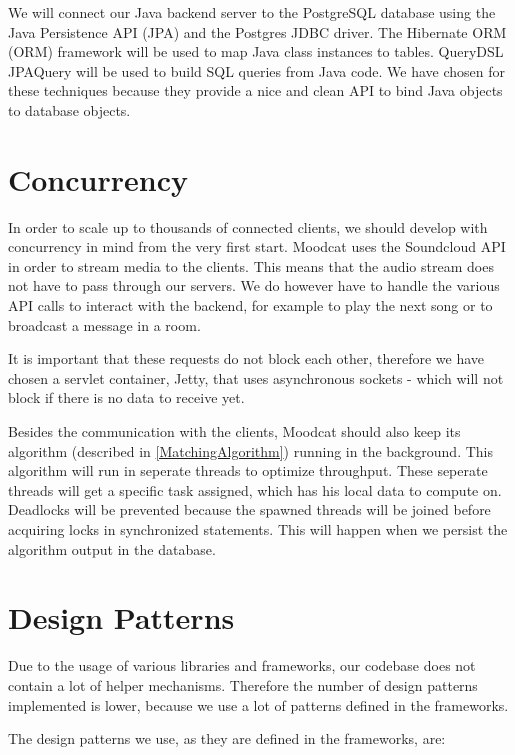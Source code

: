 \par
We will connect our Java backend server to the PostgreSQL database using the Java Persistence API (JPA) and the Postgres JDBC driver.
The Hibernate\cite{HibernateORM} \Gls{ORM} (ORM) framework will be used to map Java class instances to tables.
QueryDSL\cite{QueryDSL} JPAQuery will be used to build \Gls{SQL} queries from Java code.
We have chosen for these techniques because they provide a nice and clean API to bind Java objects to database objects.

\section{Concurrency}
In order to scale up to thousands of connected clients, we should develop with concurrency in mind from the very first start.
Moodcat uses the \gls{Soundcloud} API in order to stream media to the clients.
This means that the audio stream does not have to pass through our servers.
We do however have to handle the various API calls to interact with the backend, for example to play the next song or to broadcast a message in a room.

\par
It is important that these requests do not block each other, therefore we have chosen a servlet container, Jetty, that uses asynchronous sockets - which will not block if there is no data to receive yet.

\par
Besides the communication with the clients, Moodcat should also keep its algorithm (described in \ref{MatchingAlgorithm}) running in the background.
This algorithm will run in seperate threads to optimize throughput.
These seperate threads will get a specific task assigned, which has his local data to compute on.
Deadlocks will be prevented because the spawned threads will be joined before acquiring locks in synchronized statements.
This will happen when we persist the algorithm output in the database.

\section{Design Patterns}

Due to the usage of various libraries and frameworks, our codebase does not contain a lot of helper mechanisms.
Therefore the number of design patterns implemented is lower, because we use a lot of patterns defined in the frameworks.

The design patterns we use, as they are defined in the frameworks, are:

